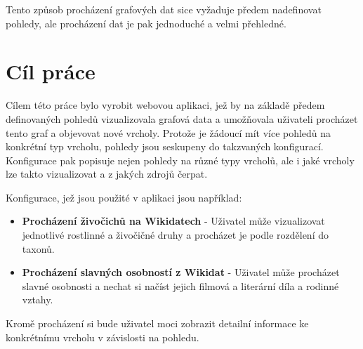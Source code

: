 Tento způsob procházení grafových dat sice vyžaduje předem nadefinovat pohledy, ale procházení dat je pak jednoduché a velmi přehledné.

\section{Cíl práce}

Cílem této práce bylo vyrobit webovou aplikaci, jež by na základě předem definovaných pohledů vizualizovala grafová data a umožňovala uživateli procházet tento graf a objevovat nové vrcholy. Protože je žádoucí mít více pohledů na konkrétní typ vrcholu, pohledy jsou seskupeny do takzvaných konfigurací. Konfigurace pak popisuje nejen pohledy na různé typy vrcholů, ale i jaké vrcholy lze takto vizualizovat a z jakých zdrojů čerpat.

Konfigurace, jež jsou použité v aplikaci jsou například:
\begin{itemize}
    \item \textbf{Procházení živočichů na Wikidatech} - Uživatel může vizualizovat jednotlivé rostlinné a živočičné druhy a procházet je podle rozdělení do taxonů.
    \item \textbf{Procházení slavných osobností z Wikidat} - Uživatel může procházet slavné osobnosti a nechat si načíst jejich filmová a literární díla a rodinné vztahy.
\end{itemize}

Kromě procházení si bude uživatel moci zobrazit detailní informace ke konkrétnímu vrcholu v závislosti na pohledu.
